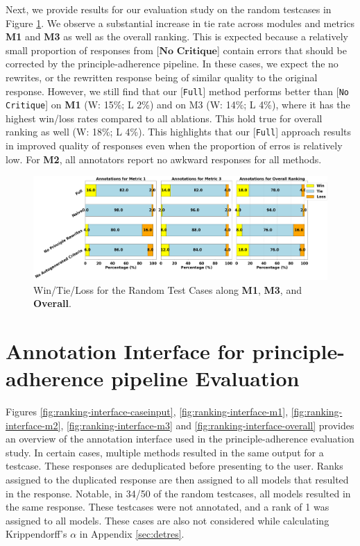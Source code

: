 \documentclass[11pt]{article}
\begin{document}
Next, we provide results for our evaluation study on the random testcases in Figure \ref{fig:wtl-error2}. We observe a substantial increase in tie rate across modules and metrics \textbf{M1} and \textbf{M3} as well as the overall ranking. This is expected because a relatively small proportion of responses from [$\textbf{No Critique}$] contain errors that should be corrected by the principle-adherence pipeline. In these cases, we expect the no rewrites, or the rewritten response being of similar quality to the original response. However, we still find that our [\texttt{Full}]
method performs better than [\texttt{No Critique}] on
\textbf{M1} (W: 15\%; L 2\%) and on M3 (W: 14\%; L 4\%), where it has the highest win/loss rates compared to all ablations. This hold true for overall ranking as well (W: 18\%; L 4\%). This highlights that our [\texttt{Full}] approach results in improved quality of responses even when the proportion of erros is relatively low. For \textbf{M2}, all annotators report no awkward responses for all methods. 

\begin{figure} [ht]
    \centering
    \includegraphics[width=\textwidth]{figures/random.png}
    \caption{Win/Tie/Loss for the Random Test Cases along \textbf{M1}, \textbf{M3}, and \textbf{Overall}.}
    \label{fig:wtl-error2}
\end{figure}

\section{Annotation Interface for principle-adherence pipeline Evaluation}
\label{sec:annotint}

Figures \ref{fig:ranking-interface-caseinput}, \ref{fig:ranking-interface-m1}, \ref{fig:ranking-interface-m2}, \ref{fig:ranking-interface-m3} and \ref{fig:ranking-interface-overall} provides an overview of the annotation interface used in the principle-adherence evaluation study. In certain cases, multiple methods resulted in the same output for a testcase. These responses are deduplicated before presenting to the user. Ranks assigned to the duplicated response are then assigned to all models that resulted in the response. Notable, in 34/50 of the random testcases, all models resulted in the same response. These testcases were not annotated, and a rank of 1 was assigned to all models. These cases are also not considered while calculating Krippendorff's $\alpha$ in Appendix \ref{sec:detres}.
\end{document}

